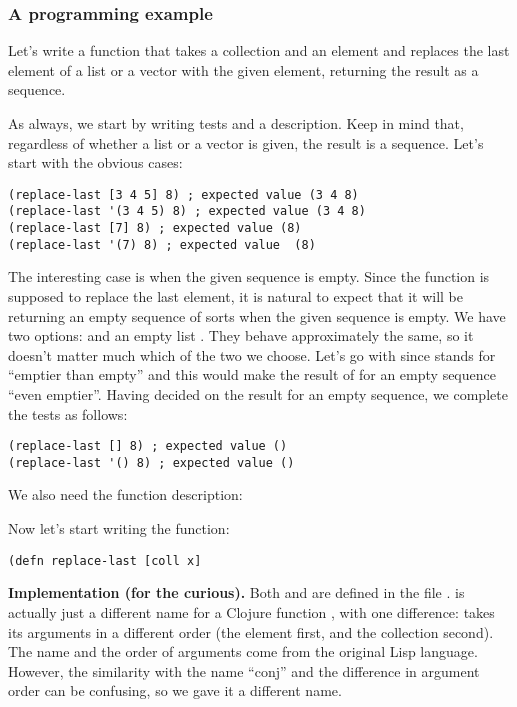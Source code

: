 \subsubsection{A programming example}\label{subsub:add-first-last-example}
Let's write a function  that takes a collection and an element and replaces the last element of a list or a vector with the given element, returning the result as a sequence. 

As always, we start by writing tests and a description. Keep in mind that, regardless of whether a list or a vector is given, the result is a sequence. Let's start with the obvious cases:
\begin{framed}
\begin{verbatim}
(replace-last [3 4 5] 8) ; expected value (3 4 8)
(replace-last '(3 4 5) 8) ; expected value (3 4 8)
(replace-last [7] 8) ; expected value (8)
(replace-last '(7) 8) ; expected value  (8)
\end{verbatim}
\end{framed}
The interesting case is when the given sequence is empty. Since the function is supposed to replace the last element, it is natural to expect that it will be returning an empty sequence of sorts when the given sequence is empty. We have two options:  and an empty list . They behave approximately the same, so it doesn't matter much which of the two we choose. Let's go with   since  stands for ``emptier than empty'' and this would make the result of for an empty sequence ``even emptier''. Having decided on the result for an empty sequence, we complete the tests as follows:
\begin{framed}
\begin{verbatim}
(replace-last [] 8) ; expected value ()
(replace-last '() 8) ; expected value ()
\end{verbatim}
\end{framed}
We also need the function description: 

Now let's start writing the function:
\begin{framed}
\begin{verbatim}
(defn replace-last [coll x] 

\end{verbatim}
\end{framed}

{\bf Implementation (for the curious).} Both  and  are defined in the file .  is actually just a different name for a Clojure function , with one difference:  takes its arguments in a different order (the element first, and the collection second). The name  and the order of arguments come from the original Lisp language. However, the similarity with the name ``conj''  and the difference in argument order can be confusing, so we gave it a different name. 

